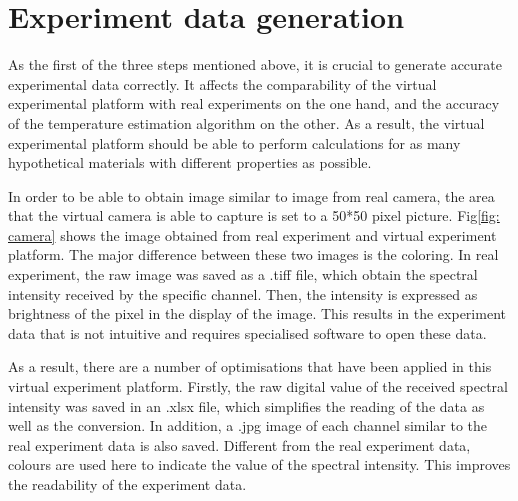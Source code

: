 \section{Experiment data generation}
As the first of the three steps mentioned above, it is crucial to generate 
accurate experimental data correctly. It affects the comparability of the 
virtual experimental platform with real experiments on the one hand, and 
the accuracy of the temperature estimation algorithm on the other. As a 
result, the virtual experimental platform should be able to perform 
calculations for as many hypothetical materials with different properties 
as possible.


In order to be able to obtain image similar to image from
real camera, the area that the virtual camera is able to capture is 
set to a 50*50 pixel picture. Fig\ref{fig: camera} shows the image obtained 
from real experiment and virtual experiment platform. The major difference between 
these two images is the coloring. In real experiment, the raw image was saved 
as a .tiff file, which obtain the spectral intensity received by the specific 
channel. Then, the intensity is expressed as brightness of the pixel in the display of 
the image. This results in the experiment data that is not intuitive and 
requires specialised software to open these data.


As a result, there are a number of optimisations that have been applied 
in this virtual experiment platform. Firstly, the raw digital value 
of the received spectral intensity was saved in an .xlsx file, which 
simplifies the reading of the data as well as the conversion. In 
addition, a .jpg image of each channel similar to the real experiment data is also 
saved. Different from the real experiment data, colours are used here to 
indicate the value of the spectral intensity. This improves the 
readability of the experiment data.


